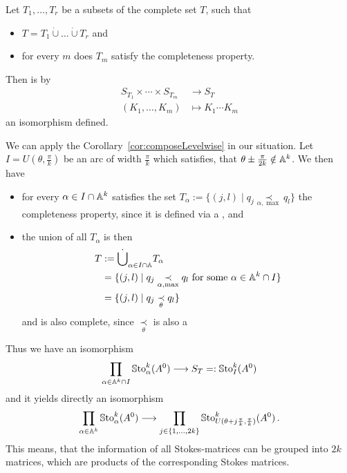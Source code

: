 \begin{cor}\label{cor:composeLevelwise}
  Let $T_1,\dots,T_r$ be a subsets of the complete set $T$, such that
  \begin{itemize}
    \item $T=T_1\dot\cup\dots\dot\cup T_r$ and
    \item for every $m$ does $T_m$ satisfy the completeness property.
  \end{itemize}
  Then is by
  \begin{align*}
    S_{T_1}\times\cdots\times S_{T_m} &\longrightarrow S_T
  \\(K_1,\dots,K_m) &\longmapsto K_1\cdots K_m
  \end{align*}
  an isomorphism defined.
\end{cor}
We can apply the Corollary~\ref{cor:composeLevelwise} in our situation. Let
$I=U(\theta,\frac{\pi}{k})$ be an arc of width $\frac{\pi}{k}$ which satisfies,
that $\theta\pm\frac{\pi}{2k}\notin\mathbb{A}^k$.
We then have
\begin{itemize}
  \item for every $\alpha\in I\cap \mathbb{A}^k$ satisfies the set
    $T_{\alpha}:=\{(j,l)\mid q_j\underset{\alpha,\max}{\prec}q_l\}$
    the completeness property, since it is defined via a , and
  \item the union of all $T_{\alpha}$ is then
    \begin{align*}
      T&:=\dot\bigcup_{\alpha\in I\cap\mathbb{A}}T_{\alpha}
      \\&=\{(j,l) \mid q_j \underset{\alpha,\max}{\prec} q_l
          \text{~for some~}\alpha\in\mathbb{A}^k\cap I \}
      \\&=\{(j,l) \mid q_j \underset{\theta}{\prec} q_l \}
    \end{align*}
    and is also complete, since $\underset{\theta}{\prec}$ is also a
\end{itemize}
Thus we have an isomorphism
\begin{align*}
  \prod_{\alpha\in\mathbb{A}^k\cap I}\operatorname{\mathbb{S}to}_\alpha^k(A^0)
  \longrightarrow
  S_T=:\operatorname{\mathbb{S}to}_I^k(A^0)
\end{align*}
and it yields directly an isomorphism
\[
  \prod_{\alpha\in\mathbb{A}^k}\operatorname{\mathbb{S}to}_\alpha^k(A^0)
  \longrightarrow
  \prod_{j\in\{1,\dots,2k\}}
  \operatorname{\mathbb{S}to}_{U(\theta+j\frac{\pi}{k},\frac{\pi}{k})}^k(A^0) \,.
\]
This means, that the information of all Stokes-matrices can be grouped into
$2k$ matrices, which are products of the corresponding Stokes matrices.

